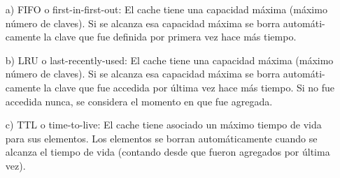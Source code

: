 \documentclass{article}
\begin{document}
\begin{itemize}
    \item [a)] FIFO o first-in-first-out:
    El cache tiene una capacidad m\'axima (m\'aximo n\'umero de claves). Si se alcanza esa capacidad m\'axima se borra autom\'ati-
    camente la clave que fue definida por primera vez hace m\'as tiempo.
    \item [b)] LRU o last-recently-used:
    El cache tiene una capacidad m\'axima (m\'aximo n\'umero de claves). Si se alcanza esa capacidad m\'axima se borra autom\'ati-
    camente la clave que fue accedida por \'ultima vez hace m\'as tiempo. Si no fue accedida nunca, se considera el momento en
    que fue agregada.
    \item [c)] TTL o time-to-live:
    El cache tiene asociado un m\'aximo tiempo de vida para sus elementos. Los elementos se borran autom\'aticamente cuando
    se alcanza el tiempo de vida (contando desde que fueron agregados por \'ultima vez).
\end{itemize}
\end{document}
